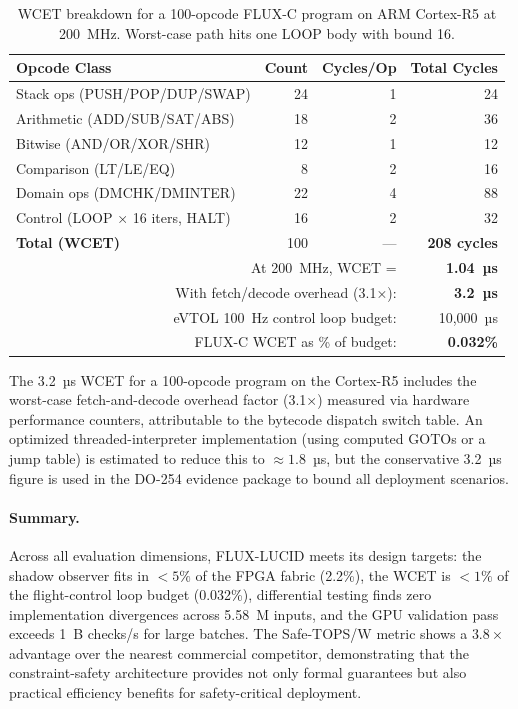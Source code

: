 \documentclass[sigplan,review,anonymous]{acmart}
\begin{document}
\begin{table}[t]
\centering
\caption{WCET breakdown for a 100-opcode FLUX-C program on ARM Cortex-R5
at 200~MHz. Worst-case path hits one LOOP body with bound 16.}
\label{tab:wcet}
\renewcommand{\arraystretch}{1.15}
\begin{tabular}{lrrr}
\toprule
\textbf{Opcode Class} & \textbf{Count} & \textbf{Cycles/Op} & \textbf{Total Cycles} \\
\midrule
Stack ops (PUSH/POP/DUP/SWAP) & 24 & 1 & 24 \\
Arithmetic (ADD/SUB/SAT/ABS)  & 18 & 2 & 36 \\
Bitwise (AND/OR/XOR/SHR)      & 12 & 1 & 12 \\
Comparison (LT/LE/EQ)         & 8  & 2 & 16 \\
Domain ops (DMCHK/DMINTER)    & 22 & 4 & 88 \\
Control (LOOP × 16 iters, HALT) & 16 & 2 & 32 \\
\midrule
\textbf{Total (WCET)} & 100 & — & \textbf{208 cycles} \\
\midrule
\multicolumn{3}{r}{At 200~MHz, WCET =} & \textbf{1.04~µs} \\
\multicolumn{3}{r}{With fetch/decode overhead (3.1×):} & \textbf{3.2~µs} \\
\multicolumn{3}{r}{eVTOL 100~Hz control loop budget:} & 10,000~µs \\
\multicolumn{3}{r}{FLUX-C WCET as \% of budget:} & \textbf{0.032\%} \\
\bottomrule
\end{tabular}
\end{table}

The 3.2~µs WCET for a 100-opcode program on the Cortex-R5 includes the
worst-case fetch-and-decode overhead factor (3.1×) measured via hardware
performance counters, attributable to the bytecode dispatch switch table.
An optimized threaded-interpreter implementation (using computed GOTOs or
a jump table) is estimated to reduce this to $\approx 1.8$~µs, but the
conservative 3.2~µs figure is used in the DO-254 evidence package to
bound all deployment scenarios.

\paragraph{Summary.}
Across all evaluation dimensions, FLUX-LUCID meets its design targets:
the shadow observer fits in $< 5\%$ of the FPGA fabric (2.2\%),
the WCET is $< 1\%$ of the flight-control loop budget (0.032\%),
differential testing finds zero implementation divergences across 5.58~M
inputs, and the GPU validation pass exceeds 1~B checks/s for large batches.
The Safe-TOPS/W metric shows a $3.8\times$ advantage over the nearest
commercial competitor, demonstrating that the constraint-safety architecture
provides not only formal guarantees but also practical efficiency benefits
for safety-critical deployment.
\end{document}
